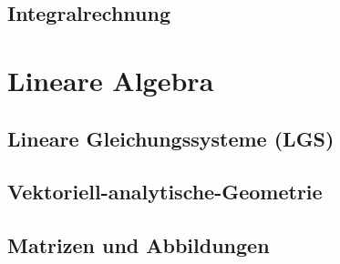 \documentclass [a4paper, 12pt]{amsbook}
\begin{document}
%

\chapter{Integralrechnung}


\part{Lineare Algebra}

\chapter{Lineare Gleichungssysteme (LGS)}


\chapter{Vektoriell-analytische-Geometrie}


\chapter{Matrizen und Abbildungen}





%



\end{document}
